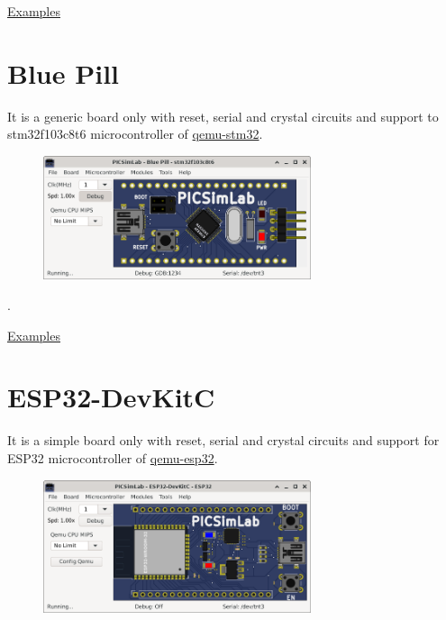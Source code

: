 \href{https://lcgamboa.github.io/picsimlab_examples/board_uCboard.html}{Examples}


\section{Blue Pill}

It is a generic board only with reset, serial and crystal circuits and support to stm32f103c8t6 microcontroller of 
\href{https://beckus.github.io/qemu_stm32/}{qemu-stm32}.

\begin{figure}[H]
\center
\includegraphics[width=0.7\textwidth]{img/Blue_Pill.png} 
\end{figure} 

.\vspace{0.5cm}

\href{https://lcgamboa.github.io/picsimlab_examples/board_Blue_Pill.html}{Examples}


\section{ESP32-DevKitC}

It is a simple board only with reset, serial and crystal circuits and support 
for ESP32 microcontroller of \href{https://github.com/a159x36/qemu}{qemu-esp32}.

\begin{figure}[H]
\center
\includegraphics[width=0.7\textwidth]{img/DevKitC.png} 
\end{figure} 

